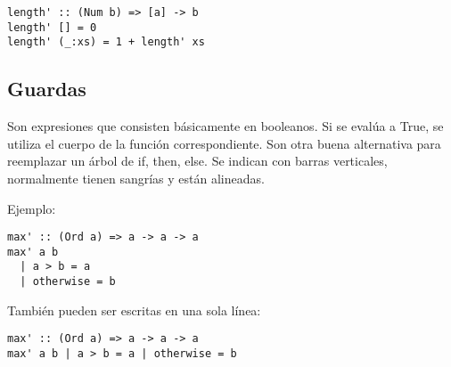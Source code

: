 \begin{lstlisting}
length' :: (Num b) => [a] -> b
length' [] = 0
length' (_:xs) = 1 + length' xs
\end{lstlisting}


\subsection{Guardas} %
\label{sub:guardas}

Son expresiones que consisten básicamente en booleanos. Si se evalúa a True, se utiliza el cuerpo de la función correspondiente. Son otra buena alternativa para reemplazar un árbol de if, then, else.
Se indican con barras verticales, normalmente tienen sangrías y están alineadas.

Ejemplo:

\begin{lstlisting}
max' :: (Ord a) => a -> a -> a
max' a b
  | a > b = a
  | otherwise = b
\end{lstlisting}

También pueden ser escritas en una sola línea:

\begin{lstlisting}
max' :: (Ord a) => a -> a -> a
max' a b | a > b = a | otherwise = b
\end{lstlisting}


